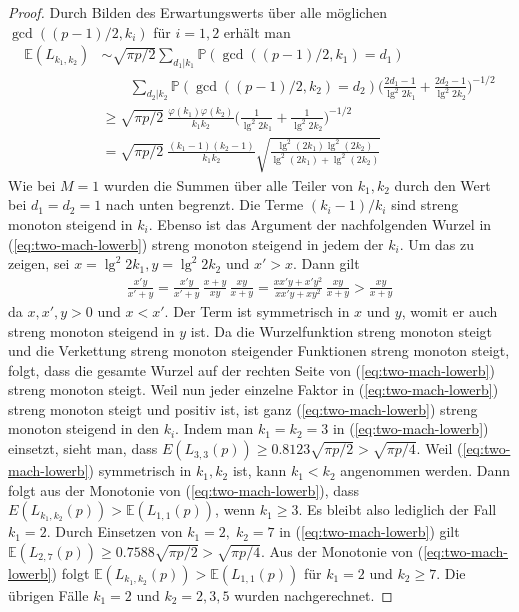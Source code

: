 \documentclass[a4paper, 11pt, ngerman]{article}
\newcommand{\E}{\mathbb{E}}
\renewcommand{\P}{\mathbb{P}}
\theoremstyle{definition}
\theoremstyle{plain}
\theoremstyle{remark}
\begin{document}
\begin{proof}
    Durch Bilden des Erwartungswerts über alle möglichen $\gcd((p - 1)/2, k_i)$ für $i = 1, 2$ erhält man
    \begin{align}
        \E(L_{k_1, k_2})
         & \sim \sqrt{\pi p / 2}
        \sum_{d_1 | k_1} \P(\gcd((p - 1)/2, k_1) = d_1)
        \nonumber                                                 \\
         & \qquad \sum_{d_2 | k_2} \P(\gcd((p - 1)/2, k_2) = d_2)
        \Bigg ( \frac {2d_1 - 1} {\lg^2 2k_1}
        + \frac {2d_2 - 1} {\lg^2 2k_2} \Bigg )^{-1/2}
        \nonumber                                                 \\
         & \ge \sqrt{\pi p / 2} \
        \frac {\varphi(k_1) \varphi(k_2)} {k_1k_2}
        \Bigg (\frac 1 {\lg^2 2k_1} + \frac 1 {\lg^2 2k_2} \Bigg )^{-1/2}
        \nonumber                                                 \\
         & = \sqrt{\pi p / 2} \
        \frac {(k_1 - 1) (k_2- 1)} {k_1k_2}
        \sqrt{\frac{\lg^2(2k_1) \lg^2(2k_2)}{\lg^2(2k_1) + \lg^2(2k_2)}}
        \label{eq:two-mach-lowerb}
    \end{align}
    Wie bei $M = 1$ wurden die Summen über alle Teiler von $k_1, k_2$ durch den Wert bei $d_1 = d_2 = 1$ nach unten begrenzt. Die Terme $(k_i - 1)/k_i$ sind streng monoton steigend in $k_i$. Ebenso ist das Argument der nachfolgenden Wurzel in (\ref{eq:two-mach-lowerb}) streng monoton steigend in jedem der $k_i$. Um das zu zeigen, sei $x = \lg^2 2k_1, y = \lg^2 2k_2$ und $x' > x$. Dann gilt
    \begin{align*}
        \frac {x'y} {x' + y}
        = \frac {x'y} {x' + y} \, \frac {x + y} {xy} \, \frac {xy} {x + y}
        = \frac {xx'y + x'y^2} {xx'y + xy^2} \, \frac {xy} {x + y}
        > \frac {xy} {x + y}
    \end{align*}
    da $x, x', y > 0$ und $x < x'$. Der Term ist symmetrisch in $x$ und $y$, womit er auch streng monoton steigend in $y$ ist. Da die Wurzelfunktion streng monoton steigt und die Verkettung streng monoton steigender Funktionen streng monoton steigt, folgt, dass die gesamte Wurzel auf der rechten Seite von (\ref{eq:two-mach-lowerb}) streng monoton steigt. Weil nun jeder einzelne Faktor in (\ref{eq:two-mach-lowerb}) streng monoton steigt und positiv ist, ist ganz (\ref{eq:two-mach-lowerb}) streng monoton steigend in den $k_i$. Indem man $k_1 = k_2 = 3$ in (\ref{eq:two-mach-lowerb}) einsetzt, sieht man, dass $E(L_{3, 3}(p)) \ge 0.8123 \sqrt{\pi p /2}  > \sqrt{\pi p / 4}$. Weil (\ref{eq:two-mach-lowerb}) symmetrisch in $k_1, k_2$ ist, kann $k_1 < k_2$ angenommen werden. Dann folgt aus der Monotonie von (\ref{eq:two-mach-lowerb}), dass $E(L_{k_1, k_2}(p)) > \E(L_{1, 1}(p))$, wenn $k_1 \ge 3$. Es bleibt also lediglich der Fall $k_1 = 2$. Durch Einsetzen von $k_1 = 2, \; k_2 = 7$ in (\ref{eq:two-mach-lowerb}) gilt $\E(L_{2, 7}(p)) \ge 0.7588 \sqrt{\pi p / 2} > \sqrt{\pi p / 4}$. Aus der Monotonie von (\ref{eq:two-mach-lowerb}) folgt $\E(L_{k_1, k_2}(p)) > \E(L_{1, 1}(p))$ für $k_1 = 2$ und $k_2 \ge 7$. Die übrigen Fälle $k_1 = 2$ und $k_2 = 2, 3, 5$ wurden nachgerechnet.


\end{proof}
\end{document}
